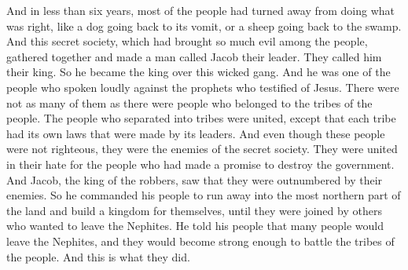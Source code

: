And in less than six years, most of the people had turned away from doing what was right, like a dog going back to its vomit, or a sheep going back to the swamp.
\bverse \iffalse Now this secret combination, which had brought so great iniquity upon the people, did gather themselves together, and did place at their head a man whom they did call Jacob; \fi
And this secret society, which had brought so much evil among the people, gathered together and made a man called Jacob their leader.
\bverse \iffalse And they did call him their king; therefore he became a king over this wicked band; and he was one of the chiefest who had given his voice against the prophets who testified of Jesus. \fi
They called him their king. So he became the king over this wicked gang. And he was one of the people who spoken loudly against the prophets who testified of Jesus.
\bverse \iffalse And it came to pass that they were not so strong in number as the tribes of the people, who were united together save it were their leaders did establish their laws, every one according to his tribe; nevertheless they were enemies; notwithstanding they were not a righteous people, yet they were united in the hatred of those who had entered into a covenant to destroy the government. \fi
There were not as many of them as there were people who belonged to the tribes of the people. The people who separated into tribes were united, except that each tribe had its own laws that were made by its leaders. And even though these people were not righteous, they were the enemies of the secret society. They were united in their hate for the people who had made a promise to destroy the government.
\bverse \iffalse Therefore, Jacob seeing that their enemies were more numerous than they, he being the king of the band, therefore he commanded his people that they should take their flight into the northernmost part of the land, and there build up unto themselves a kingdom, until they were joined by dissenters, (for he flattered them that there would be many dissenters) and they become sufficiently strong to contend with the tribes of the people; and they did so. \fi
And Jacob, the king of the robbers, saw that they were outnumbered by their enemies. So he commanded his people to run away into the most northern part of the land and build a kingdom for themselves, until they were joined by others who wanted to leave the Nephites. He told his people that many people would leave the Nephites, and they would become strong enough to battle the tribes of the people. And this is what they did.
